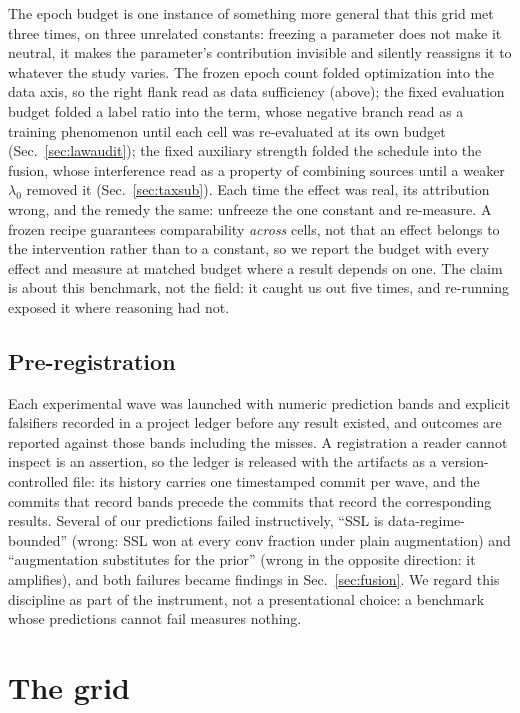  The epoch budget is one instance of something more general that this grid met
three times, on three unrelated constants: freezing a parameter does not make
it neutral, it makes the parameter's contribution invisible and silently
reassigns it to whatever the study varies. The frozen epoch count folded
optimization into the data axis, so the right flank read as data sufficiency
(above); the fixed evaluation budget folded a label ratio into the \readout{}
term, whose negative branch read as a training phenomenon until each cell was
re-evaluated at its own budget (Sec.~\ref{sec:lawaudit}); the fixed
auxiliary strength folded the schedule into the fusion, whose interference
read as a
property of combining sources until a weaker $\lambda_0$ removed it
(Sec.~\ref{sec:taxsub}). Each time the effect was real, its attribution
wrong, and the remedy the same: unfreeze the one constant and re-measure. A
frozen recipe guarantees comparability \emph{across} cells, not that an
effect belongs to the intervention rather than to a constant, so we report
the budget with every effect and measure at matched budget where a result
depends on one. The claim is about this benchmark, not the field: it caught us
out five times, and re-running exposed it where reasoning had not.

\subsection{Pre-registration}\label{sec:prereg}
Each experimental wave was launched with numeric prediction bands and explicit
falsifiers recorded in a project ledger before any result existed, and outcomes
are reported against those bands including the misses. A registration a reader
cannot inspect is an assertion, so the ledger is released with the artifacts as
a version-controlled file: its history carries one timestamped commit per wave,
and the commits that record bands precede the commits that record the
corresponding results. Several of our predictions failed instructively, ``SSL
is data-regime-bounded'' (wrong: SSL won at every conv fraction under plain
augmentation) and ``augmentation substitutes for the prior'' (wrong in the
opposite direction: it amplifies), and both failures became findings in
Sec.~\ref{sec:fusion}.  We regard this discipline as part of
the instrument, not a presentational choice: a benchmark whose predictions
cannot fail measures nothing.

\section{The grid}\label{sec:grid}


